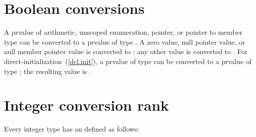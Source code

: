 \section[conv.bool]{Boolean conversions}

\pnum
{}%
A prvalue of arithmetic, unscoped enumeration, pointer, or pointer to member
type can be converted to a prvalue of type . A zero value, null
pointer value, or null member pointer value is converted to ; any
other value is converted to . For
direct-initialization~(\ref{dcl.init}), a prvalue of type
 can be converted to a prvalue of type
; the resulting value is .

\section[conv.rank]{Integer conversion rank}%

\pnum
Every integer type has an  defined as follows:

